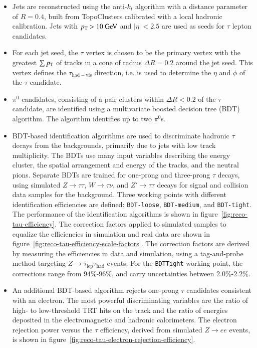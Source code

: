 \begin{itemize}
	\item Jets are reconstructed using the anti-$k_t$ algorithm with a distance parameter of $R=0.4$, built from TopoClusters calibrated with a local hadronic calibration. Jets with $\pt>10 \GeV$ and $|\eta|<2.5$ are used as seeds for $\tau$ lepton candidates.

	\item For each jet seed, the $\tau$ vertex is chosen to be the primary vertex with the greatest $\sum p_{\text{T}}$ of tracks in a cone of radius $\Delta R=0.2$ around the jet seed. This vertex defines the $\tau_{\mathrm{had-vis}}$ direction, i.e. is used to determine the $\eta$ and $\phi$ of the $\tau$ candidate. 

	\item $\pi^0$ candidates, consisting of a pair clusters within $\Delta R<0.2$ of the $\tau$ candidate, are identified using a multivariate boosted decision tree (BDT) algorithm. The algorithm identifies up to two $\pi^0$s.

	\item BDT-based identification algorithms are used to discriminate hadronic $\tau$ decays from the backgrounds, primarily due to jets with low track multiplicity. The BDTs use many input variables describing the energy cluster, the spatial arrangement and energy of the tracks, and the neutral pions. Separate BDTs are trained for one-prong and three-prong $\tau$ decays, using simulated $Z\rightarrow\tau\tau$, $W\rightarrow \tau\nu$, and $Z'\rightarrow\tau\tau$ decays for signal and collision data samples for the background. Three working points with different identification efficiencies are defined: \texttt{BDT-loose}, \texttt{BDT-medium}, and \texttt{BDT-tight}. The performance of the identification algorithms is shown in figure~\ref{fig:reco-tau-efficiency}. The correction factors applied to simulated samples to equalize the efficiencies in simulation and real data are shown in figure~\ref{fig:reco-tau-efficiency-scale-factors}. The correction factors are derived by measuring the efficiencies in data and simulation, using a tag-and-probe method targeting $Z\rightarrow\tau_{\mathrm{lep}}\tau_{\mathrm{had}}$ events. For the \texttt{BDTTight} working point, the corrections range from $94\%$-$96\%$, and carry uncertainties between $2.0\%$-$2.2\%$. 

	\item An additional BDT-based algorithm rejects one-prong $\tau$ candidates consistent with an electron. The most powerful discriminating variables are the ratio of high- to low-threshold TRT hits on the track and the ratio of energies deposited in the electromagnetic and hadronic calorimeters. The electron rejection power versus the $\tau$ efficiency, derived from simulated $Z\rightarrow ee$ events, is shown in figure~\ref{fig:reco-tau-electron-rejection-efficiency}.  
\end{itemize}


